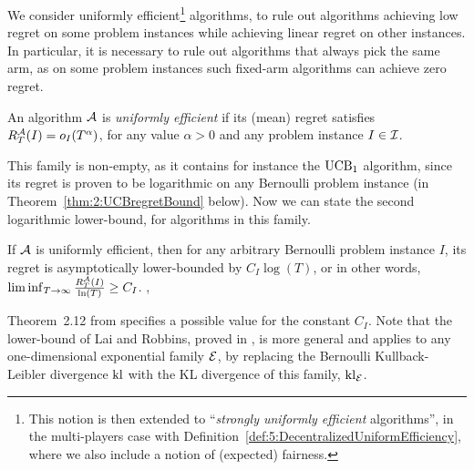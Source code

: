 We consider uniformly efficient\footnote{This notion is then extended to ``\emph{strongly uniformly efficient} algorithms'', in the multi-players case with Definition~\ref{def:5:DecentralizedUniformEfficiency}, where we also include a notion of (expected) fairness.} algorithms, to rule out algorithms achieving low regret on some problem instances while achieving linear regret on other instances.
In particular, it is necessary to rule out algorithms that always pick the same arm, as on some problem instances such fixed-arm algorithms can achieve zero regret.

\begin{definition}\label{def:2:uniformlyEfficientAlgorithm}
\begin{leftbar}[defnbar]  %
    An algorithm $\mathcal{A}$ is \emph{uniformly efficient} if its (mean) regret satisfies
    $R_T^{\mathcal{A}}(I) = o_I(T^{\alpha})$,
    for any value $\alpha>0$ and any problem instance $I\in \mathcal{I}$.
\end{leftbar}  %
\end{definition}

This family is non-empty, as it contains for instance the $\mathrm{UCB}_1$ algorithm, since its regret is proven to be logarithmic on any Bernoulli problem instance (in Theorem~\ref{thm:2:UCBregretBound} below).
Now we can state the second logarithmic lower-bound, for algorithms in this family.

\begin{theorem}\label{thm:2:secondLogTLowerBound}
\begin{leftbar}[theorembar]  %
    If $\mathcal{A}$ is uniformly efficient,
    then for any arbitrary Bernoulli problem instance $I$,
    its regret is asymptotically lower-bounded by $C_I \log(T)$,
    or in other words,
    $\liminf_{T\to\infty} \frac{R_T^{\mathcal{A}}(I)}{\ln(T)} \geq C_I$.
    \hfill{} \cite[Theorem~2.13]{Slivkins2019},
\end{leftbar}  %
\end{theorem}

Theorem~2.12 from \cite{Slivkins2019} specifies a possible value for the constant $C_I$.
Note that the lower-bound of Lai and Robbins, proved in \cite{LaiRobbins85}, is more general and applies to any one-dimensional exponential family $\mathcal{E}$, by replacing the Bernoulli Kullback-Leibler divergence $\mathrm{kl}$ with the KL divergence of this family, $\mathrm{kl}_{\mathcal{E}}$.

